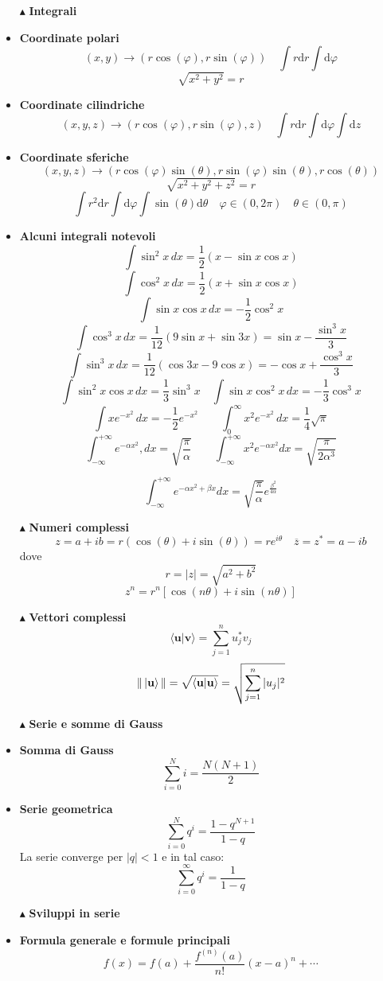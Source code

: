 \documentclass{book}
\newcommand{\g}{\textbf}
\newcommand{\e}{\begin{equation}}
\newcommand{\ex}{\end{equation} }
\renewcommand{\it}{\item[$\cdot$]}
\begin{document}
\begin{multicols}{4}
\begin{itemize}
\item [$\blacktriangle$] \g{Integrali}
\it \g{Coordinate polari}
\e{(x,y) \rightarrow (r\cos(\varphi), r\sin(\varphi)) \quad \int r \text{d}r\int \text{d}\varphi}\ex
\e{\sqrt{x^{2}+y^{2}} = r}\ex
\it \g{Coordinate cilindriche}
\e{(x,y,z) \rightarrow (r\cos(\varphi),r\sin(\varphi),z) \quad \int r \text{d}r\int \text{d}\varphi\int \text{d}z }\ex
\it \g{Coordinate sferiche}
\e{(x,y,z) \rightarrow (r\cos(\varphi)\sin(\theta),r\sin(\varphi)\sin(\theta),r\cos(\theta))  }\ex
\e{\sqrt{x^{2}+y^{2}+z^{2}} = r}\ex
\e{\int r^{2} \text{d}r\int \text{d}\varphi\int \sin(\theta)\text{d}\theta \quad \varphi \in (0,2\pi) \quad \theta \in (0,\pi)}\ex
    \it \g{Alcuni integrali notevoli}
        \e{\int \sin^2x \, dx = \frac{1}{2}(x - \sin x \cos x)} \ex
        \e{\int \cos^2x \, dx = \frac{1}{2}(x + \sin x \cos x) }\ex \e{ \int \sin x \cos x \, dx = -\frac{1}{2}\cos^2x} \ex
        \e{\int \cos^3x \, dx = \frac{1}{12}(9\sin x + \sin 3x) = \sin x - \frac{\sin^3x}{3}} \ex
        \e{\int \sin^3x \, dx = \frac{1}{12}(\cos 3x - 9\cos x) = -\cos x + \frac{\cos^3x}{3}} \ex
        \e{\int \sin^2x \cos x \, dx = \frac{1}{3}\sin^3x \quad \int \sin x \cos^2x \, dx = -\frac{1}{3}\cos^3x} \ex
        \e{\int x e^{-x^2} \, dx = -\frac{1}{2} e^{-x^2} \qquad \int_0^\infty x^2 e^{-x^2} \, dx = \frac{1}{4} \sqrt{\pi}} \ex
       \e{ \int_{-\infty}^{+\infty} e^{-\alpha x^2} , dx = \sqrt{\frac{\pi}{\alpha}} \qquad \int_{-\infty}^{+\infty} x^2 e^{-\alpha x^2} dx = \sqrt{\frac{\pi}{2\alpha^3}} }\ex

\e{\int_{-\infty}^{+\infty} e^{-\alpha x^2 + \beta x}  dx = \sqrt{\frac{\pi}{\alpha}}  e^{\frac{\beta^2}{4\alpha}}} \ex

        \item [$\blacktriangle$] \g{Numeri complessi}
        \e{z = a + ib = r(\cos(\theta) + i\sin(\theta)) = re^{i\theta} \quad \overline{z} = z^{*} = a - ib}\ex
        dove 
        \e{r = |z| = \sqrt{a^{2}+b^{2}} }\ex
        \e{z^n = r^n \left[ \cos(n\theta) + i\sin(n\theta) \right]}\ex
        \item [$\blacktriangle$] \g{Vettori complessi} 
        \e{\langle \mathbf{u} | \mathbf{v} \rangle = \sum_{j=1}^n u_j^* v_j}\ex
        \e{\|\ket{\mathbf{u}}\| = \sqrt{\langle \mathbf{u} | \mathbf{u} \rangle} = \sqrt{\sum_{j=1}^n |u_j|^2}
}\ex
\item [$\blacktriangle$] \g{Serie e somme di Gauss}
    \it \g{Somma di Gauss}
        \e{\sum_{i=0}^N i = \frac{N(N + 1)}{2}} \ex
    \it \g{Serie geometrica}
        \e{\sum_{i=0}^N q^i = \frac{1 - q^{N+1}}{1 - q}} \ex
        La serie converge per $|q| < 1$ e in tal caso:
        \e{\sum_{i=0}^\infty q^i = \frac{1}{1 - q}} \ex
\item [$\blacktriangle$] \g{Sviluppi in serie}
\it \g{Formula generale e formule principali}
\e{f(x) = f(a) + \frac{f^{(n)}(a)}{n!}(x - a)^n + \cdots}\ex
   

\end{itemize}
\end{multicols}
\end{document}
